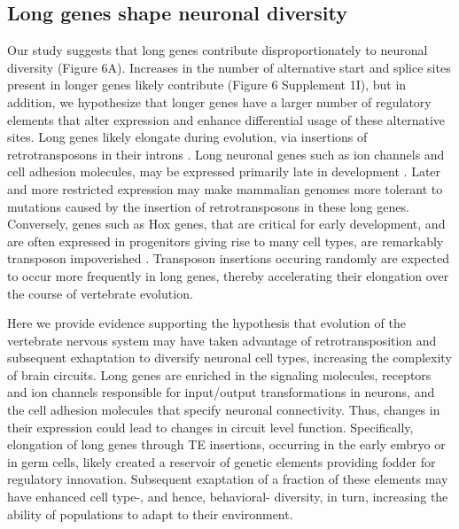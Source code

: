 \subsection{Long genes shape neuronal diversity}
Our study suggests that long genes contribute disproportionately to neuronal diversity (Figure 6A). Increases in the number of alternative start and splice sites present in longer genes likely contribute (Figure 6 Supplement 1I), but in addition, we hypothesize that longer genes have a larger number of regulatory elements that alter expression and enhance differential usage of these alternative sites. Long genes likely elongate during evolution, via insertions of retrotransposons in their introns \cite{Sela_2007,Grishkevich_2014}. Long neuronal genes such as ion channels and cell adhesion molecules, may be expressed primarily late in development \cite{Okaty_2009}. Later and more restricted expression may make mammalian genomes more tolerant to mutations caused by the insertion of retrotransposons in these long genes. Conversely, genes such as Hox genes, that are critical for early development, and are often expressed in progenitors giving rise to many cell types, are remarkably transposon impoverished \cite{Chinwalla_2002,Simons_2005}. Transposon insertions occuring randomly are expected to occur more frequently in long genes, thereby accelerating their elongation over the course of vertebrate evolution. %

Here we provide evidence supporting the hypothesis that evolution of the vertebrate nervous system may have taken advantage of retrotransposition and subsequent exhaptation to diversify neuronal cell types, increasing the complexity of brain circuits. Long genes are enriched in the signaling molecules, receptors and ion channels responsible for input/output transformations in neurons, and the cell adhesion molecules that specify neuronal connectivity. Thus, changes in their expression could lead to changes in circuit level function. Specifically, elongation of long genes through TE insertions, occurring in the early embryo or in germ cells, likely created a reservoir of genetic elements providing fodder for regulatory innovation. Subsequent exaptation of a fraction of these elements may have enhanced cell type-, and hence, behavioral- diversity, in turn, increasing the ability of populations to adapt to their environment. 

